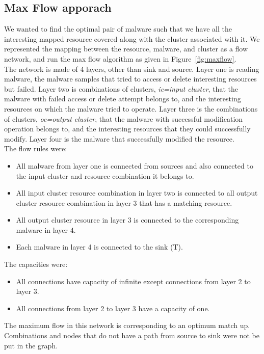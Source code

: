 \subsection{Max Flow apporach}
\label{sub:Max Flow apporach}
We wanted to find the optimal pair of malware such that we have all the interesting mapped resource covered along with the cluster associated with it.
We represented the mapping between the resource, malware, and cluster as a flow network, and run the max flow algorithm as given in Figure~\ref{fig:maxflow}.\\
The network is made of 4 layers, other than sink and source. Layer one is reading malware, the malware samples that tried to access or delete interesting resources but failed.
Layer two is combinations of clusters, \emph{ic=input cluster}, that the malware with failed access or delete attempt belongs to, and the interesting resources on which the malware tried to operate.
Layer three is the combinations of clusters, \emph{oc=output cluster}, that the malware with successful modification operation belongs to, and the interesting resources that they could successfully modify.
Layer four is the malware that successfully modified the resource.\\
The flow rules were:
\begin{itemize}
  \item All malware from layer one is connected from sources and also connected to the input cluster and resource combination it belongs to.
  \item All input cluster resource combination in layer two is connected to all output cluster resource combination in layer 3 that has a matching resource.
  \item All output cluster resource in layer 3 is connected to the corresponding malware in layer 4.
  \item Each malware in layer 4 is connected to the sink (T).
\end{itemize}
The capacities were:
\begin{itemize}
  \item All connections have capacity of infinite except connections from layer 2 to layer 3.
  \item All connections from layer 2 to layer 3 have a capacity of one.
\end{itemize}
The maximum flow in this network is corresponding to an optimum match up.
Combinations and nodes that do not have a path from source to sink were not be put in the graph.\\

